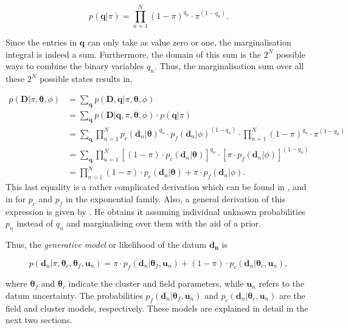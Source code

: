 \begin{equation}
p(\mathbf{q}|\pi)= \prod_{n=1}^N {(1-\pi)}^{q_n}\cdot {\pi}^{(1-q_n)}.
\end{equation}

Since the entries in $\mathbf{q}$ can only take as value zero or one, the marginalisation integral is indeed a sum. Furthermore, the domain of this sum is the $2^N$ possible ways to combine the binary variables $q_n$. Thus, the marginalisation sum over all these $2^N$ possible states results in,

\begin{align}
p(\mathbf{D}|\pi,\boldsymbol{\theta},\phi)&=\sum_{\mathbf{q}} p(\mathbf{D},\mathbf{q}|\pi,\boldsymbol{\theta},\phi)\nonumber\\
&=\sum_{\mathbf{q}} p(\mathbf{D}|\mathbf{q},\pi,\boldsymbol{\theta},\phi)\cdot p(\mathbf{q}|\pi) \nonumber \\
&=\sum_{\mathbf{q}} \prod_{n=1}^N {p_c(\mathbf{d}_n|\boldsymbol{\theta})}^{q_n}\cdot {p_f(\mathbf{d}_n|\phi)}^{(1-q_n)}\cdot \prod_{n=1}^N {(1-\pi)}^{q_n}\cdot {\pi}^{(1-q_n)} \nonumber \\
&=\sum_{\mathbf{q}} \prod_{n=1}^N \left[(1-\pi)\cdot p_c(\mathbf{d}_n|\boldsymbol{\theta})\right]^{q_n}\cdot \left[\pi\cdot p_f(\mathbf{d}_n|\phi)\right]^{(1-q_n)} \nonumber \\
&=\prod_{n=1}^N (1-\pi)\cdot p_c(\mathbf{d}_n|\boldsymbol{\theta}) + \pi\cdot p_f(\mathbf{d}_n|\phi).
\end{align}
This last equality is a rather complicated derivation which can be found in \citet{Press1997}, and in \citet{Hogg2010a} for $p_c$ and $p_f$ in the exponential family. Also, a general derivation of this expression is given by \citet{Jaynes2003}. He obtains it assuming individual unknown probabilities $p_n$ instead of $q_n$ and marginalising over them with the aid of a prior.

Thus, the \emph{generative model} or likelihood of the datum $\mathbf{d_n}$  is

\begin{equation}
\label{eq:genmod}
p(\mathbf{d}_n | \pi,\boldsymbol{\theta}_c,\boldsymbol{\theta}_f,\mathbf{u}_n)=\pi \cdot p_f(\mathbf{d}_n|\boldsymbol{\theta}_f,\mathbf{u}_n) + (1-\pi)\cdot p_c(\mathbf{d}_n| \boldsymbol{\theta}_c,\mathbf{u}_n),
\end{equation}

where $\boldsymbol{\theta}_f$ and $\boldsymbol{\theta}_c$ indicate the cluster and field parameters, while $\mathbf{u}_n$ refers to the datum uncertainty. The probabilities $p_f(\mathbf{d}_n|\boldsymbol{\theta}_f,\mathbf{u}_n)$ and $p_c(\mathbf{d}_n| \boldsymbol{\theta}_c,\mathbf{u}_n)$ are the field and cluster models, respectively. These models are explained in detail in the next two sections.

